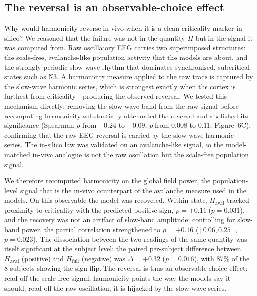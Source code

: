\documentclass[11pt]{article}
\begin{document}
\subsection{The reversal is an observable-choice effect}
Why would harmonicity reverse in vivo when it is a clean criticality marker in silico? We reasoned that the failure was not in the quantity $H$ but in the signal it was computed from. Raw oscillatory EEG carries two superimposed structures: the scale-free, avalanche-like population activity that the models are about, and the strongly periodic slow-wave rhythm that dominates synchronized, subcritical states such as N3. A harmonicity measure applied to the raw trace is captured by the slow-wave harmonic series, which is strongest exactly when the cortex is furthest from criticality---producing the observed reversal. We tested this mechanism directly: removing the slow-wave band from the raw signal before recomputing harmonicity substantially attenuated the reversal and abolished its significance (Spearman $\rho$ from $-0.24$ to $-0.09$, $p$ from $0.008$ to $0.11$; Figure~6C), confirming that the raw-EEG reversal is carried by the slow-wave harmonic series. The in-silico law was validated on an avalanche-like signal, so the model-matched in-vivo analogue is not the raw oscillation but the scale-free population signal.

We therefore recomputed harmonicity on the global field power, the population-level signal that is the in-vivo counterpart of the avalanche measure used in the models. On this observable the model was recovered. Within state, $H_\mathrm{aval}$ tracked proximity to criticality with the predicted positive sign, $\rho=+0.11$ ($p=0.031$), and the recovery was not an artifact of slow-band amplitude: controlling for slow-band power, the partial correlation strengthened to $\rho=+0.16$ ($[0.06,0.25]$, $p=0.023$). The dissociation between the two readings of the same quantity was itself significant at the subject level: the paired per-subject difference between $H_\mathrm{aval}$ (positive) and $H_\mathrm{full}$ (negative) was $\Delta=+0.32$ ($p=0.016$), with 87\% of the 8 subjects showing the sign flip. The reversal is thus an observable-choice effect: read off the scale-free signal, harmonicity points the way the models say it should; read off the raw oscillation, it is hijacked by the slow-wave series.
\end{document}
